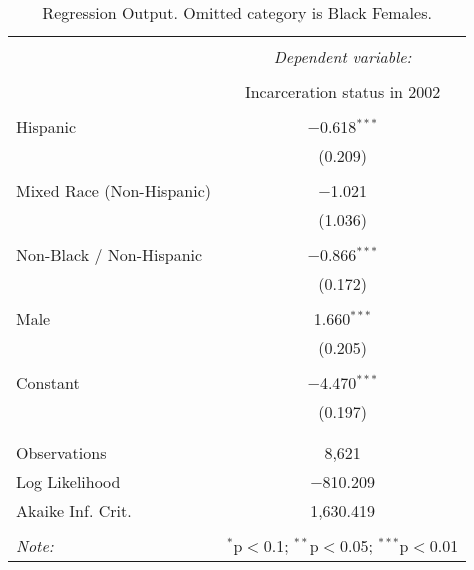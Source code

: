 
\begin{table}[!htbp] \centering 
  \caption{Regression Output. Omitted category is Black Females.} 
  \label{tab:regression} 
\begin{tabular}{@{\extracolsep{5pt}}lc} 
\\[-1.8ex]\hline 
\hline \\[-1.8ex] 
 & \multicolumn{1}{c}{\textit{Dependent variable:}} \\ 
\cline{2-2} 
\\[-1.8ex] & Incarceration status in 2002 \\ 
\hline \\[-1.8ex] 
 Hispanic & $-$0.618$^{***}$ \\ 
  & (0.209) \\ 
  & \\ 
 Mixed Race (Non-Hispanic) & $-$1.021 \\ 
  & (1.036) \\ 
  & \\ 
 Non-Black / Non-Hispanic & $-$0.866$^{***}$ \\ 
  & (0.172) \\ 
  & \\ 
 Male & 1.660$^{***}$ \\ 
  & (0.205) \\ 
  & \\ 
 Constant & $-$4.470$^{***}$ \\ 
  & (0.197) \\ 
  & \\ 
\hline \\[-1.8ex] 
Observations & 8,621 \\ 
Log Likelihood & $-$810.209 \\ 
Akaike Inf. Crit. & 1,630.419 \\ 
\hline 
\hline \\[-1.8ex] 
\textit{Note:}  & \multicolumn{1}{r}{$^{*}$p$<$0.1; $^{**}$p$<$0.05; $^{***}$p$<$0.01} \\ 
\end{tabular} 
\end{table} 
